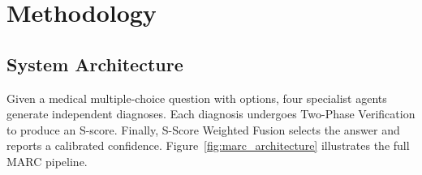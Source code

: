 \documentclass[10pt]{article}
\begin{document}
\section{Methodology}
\label{sec:method}

\subsection{System Architecture}
\label{sec:arch}

Given a medical multiple-choice question with options, four specialist agents
generate independent diagnoses.  Each diagnosis undergoes Two-Phase
Verification to produce an S-score.  Finally, S-Score Weighted Fusion selects
the answer and reports a calibrated confidence.
Figure~\ref{fig:marc_architecture} illustrates the full MARC pipeline.
\end{document}
